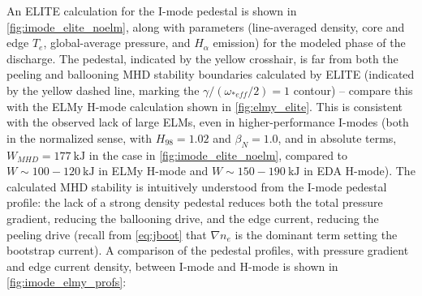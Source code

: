 An ELITE calculation for the I-mode pedestal is shown in \cref{fig:imode_elite_noelm}, along with parameters (line-averaged density, core and edge $T_e$, global-average pressure, and $H_\alpha$ emission) for the modeled phase of the discharge.  The pedestal, indicated by the yellow crosshair, is far from both the peeling and ballooning MHD stability boundaries calculated by ELITE (indicated by the yellow dashed line, marking the $\gamma/(\omega_{*eff}/2) = 1$ contour) -- compare this with the ELMy H-mode calculation shown in \cref{fig:elmy_elite}.  This is consistent with the observed lack of large ELMs, even in higher-performance I-modes (both in the normalized sense, with $H_{98} = 1.02$ and $\beta_N = 1.0$, and in absolute terms, $W_{MHD} = \SI{177}{\kilo\joule}$ in the case in \cref{fig:imode_elite_noelm}, compared to $W \sim 100-\SI{120}{\kilo\joule}$ in ELMy H-mode and $W \sim 150-\SI{190}{\kilo\joule}$ in EDA H-mode).  The calculated MHD stability is intuitively understood from the I-mode pedestal profile: the lack of a strong density pedestal reduces both the total pressure gradient, reducing the ballooning drive, and the edge current, reducing the peeling drive (recall from \cref{eq:jboot} that $\nabla n_e$ is the dominant term setting the bootstrap current).  A comparison of the pedestal profiles, with pressure gradient and edge current density, between I-mode and H-mode is shown in \cref{fig:imode_elmy_profs}:

\begin{figure}[h]
 \pushtooutside
\end{figure}

